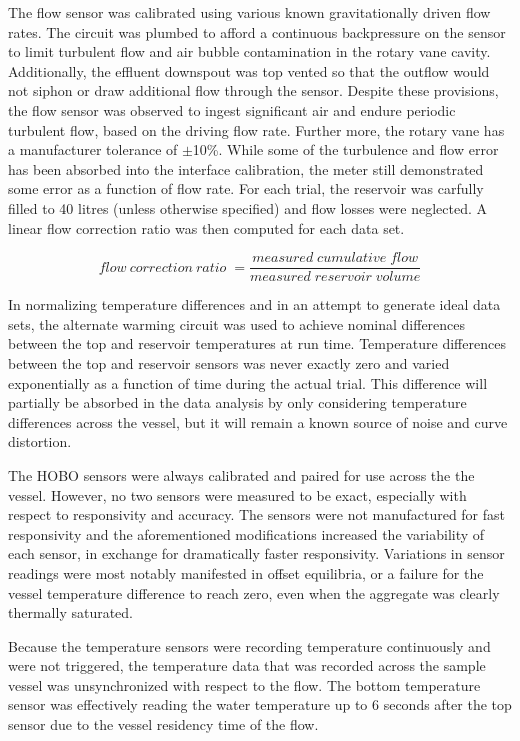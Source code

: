 The flow sensor was calibrated using various known gravitationally driven flow rates. The circuit was plumbed to afford a continuous backpressure on the sensor to limit turbulent flow and air bubble contamination in the rotary vane cavity. Additionally, the effluent downspout was top vented so that the outflow would not siphon or draw additional flow through the sensor. Despite these provisions, the flow sensor was observed to ingest significant air and endure periodic turbulent flow, based on the driving flow rate. Further more, the rotary vane has a manufacturer tolerance of $\pm$10\%. While some of the turbulence and flow error has been absorbed into the interface calibration, the meter still demonstrated some error as a function of flow rate. For each trial, the reservoir was carfully filled to 40 litres (unless otherwise specified) and flow losses were neglected. A linear flow correction ratio was then computed for each data set.

\[flow\:correction\:ratio\;=\frac{measured\;cumulative\;flow}{measured\;reservoir\;volume}\]

In normalizing temperature differences and in an attempt to generate ideal data sets, the alternate warming circuit was used to achieve nominal differences between the top and reservoir temperatures at run time. Temperature differences between the top and reservoir sensors was never exactly zero and varied exponentially as a function of time during the actual trial. This difference will partially be absorbed in the data analysis by only considering temperature differences across the vessel, but it will remain a known source of noise and curve distortion. 

The HOBO sensors were always calibrated and paired for use across the the vessel. However, no two sensors were measured to be exact, especially with respect to responsivity and accuracy. The sensors were not manufactured for fast responsivity and the aforementioned modifications increased the variability of each sensor, in exchange for dramatically faster responsivity. Variations in sensor readings were most notably manifested in offset equilibria, or a failure for the vessel temperature difference to reach zero, even when the aggregate was clearly thermally saturated. 

Because the temperature sensors were recording temperature continuously and were not triggered, the temperature data that was recorded across the sample vessel was unsynchronized with respect to the flow. The bottom temperature sensor was effectively reading the water temperature up to 6 seconds after the top sensor due to the vessel residency time of the flow. 

